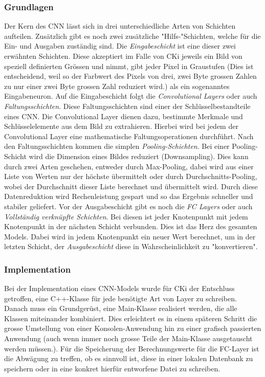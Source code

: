 \subsubsection{Grundlagen}
\label{sec:AnalyseGrundlagen}
Der Kern des CNN lässt sich in drei unterschiedliche Arten von Schichten aufteilen. Zusätzlich gibt es noch zwei zusätzliche "Hilfs-"Schichten, welche für die Ein- und Ausgaben zuständig sind. 
Die \textit{Eingabeschicht} ist eine dieser zwei erwähnten Schichten. Diese akzeptiert im Falle von CKi jeweils ein Bild von speziell definierten Grössen und nimmt, gibt jeder Pixel in Graustufen (Dies ist entscheidend, weil so der Farbwert des Pixels von drei, zwei Byte grossen Zahlen zu nur einer zwei Byte grossen Zahl reduziert wird.) als ein sogenanntes Eingabeneuron. 
Auf die Eingabeschicht folgt die \textit{Convolutional Layers} oder auch \textit{Faltungsschichten}. Diese Faltungsschichten sind einer der Schlüsselbestandteile eines CNN. Die Convolutional Layer dienen dazu, bestimmte Merkmale und Schlüsselelemente aus dem Bild zu extrahieren. Hierbei wird bei jedem der Convolutional Layer eine 
mathematische Faltungsoperationen durchführt. 
Nach den Faltungsschichten kommen die simplen \textit{Pooling-Schichten}. Bei einer Pooling-Schicht wird die Dimension eines Bildes reduziert (Downsampling). Dies kann durch zwei Arten geschehen, entweder durch Max-Pooling, dabei wird aus einer Liste von Werten nur der höchste übermittelt oder durch Durchschnitts-Pooling, wobei der Durchschnitt dieser Liste berechnet und übermittelt wird. Durch diese Datenreduktion wird Rechenleistung gespart und so das Ergebnis schneller und stabiler geliefert. 
Vor der Ausgabeschicht gibt es noch die \textit{FC Layers} oder auch \textit{Vollständig verknüpfte Schichten}. Bei diesen ist jeder Knotenpunkt mit jedem Knotenpunkt in der nächsten Schicht verbunden. Dies ist das Herz des gesamten Models. Dabei wird in jedem Knotenpunkt ein neuer Wert berechnet, um in der letzten Schicht, der \textit{Ausgabeschicht} diese in Wahrscheinlichkeit zu "konvertieren".

\subsubsection{Implementation}
\label{sec:AnalyseImplementation}
Bei der Implementation eines CNN-Models wurde für CKi der Entschluss getroffen, eine C++-Klasse für jede benötigte Art von Layer zu schreiben. Danach muss ein Grundgerüst, eine Main-Klasse realisiert werden, die alle Klassen miteinander kombiniert. Dies erleichtert es in einem späteren Schritt die grosse Umstellung von einer Konsolen-Anwendung hin zu einer grafisch passierten Anwendung (auch wenn immer noch grosse Teile der Main-Klasse ausgetauscht werden müssen.). Für die Speicherung der Berechnungswerte für die FC-Layer ist die Abwägung zu treffen, ob es sinnvoll ist, diese in einer lokalen Datenbank zu speichern oder in eine konkret hierfür entworfene Datei zu schreiben.

